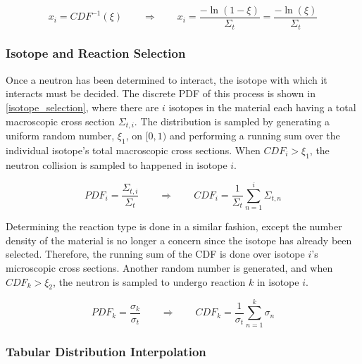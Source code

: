 \begin{equation}
\label{first_col_samp}
x_i=CDF^{-1}(\xi) \qquad \Rightarrow \qquad x_i=\frac{-\ln(1-\xi) }{\Sigma_t}=\frac{-\ln(\xi) }{\Sigma_t}
\end{equation}


\subsubsection{Isotope and Reaction Selection}

Once a neutron has been determined to interact, the isotope with which it interacts must be decided.  The discrete PDF of this process is shown in \eqref{isotope_selection}, where there are $i$ isotopes in the material each having a total macroscopic cross section $\Sigma_{t,i}$.  The distribution is sampled by generating a uniform random number, $\xi_1$, on $[0,1)$ and performing a running sum over the individual isotope's total macroscopic cross sections.  When $CDF_i > \xi_1$, the neutron collision is sampled to happened in isotope $i$.

\begin{equation}
\label{isotope_selection}
PDF_i = \frac{\Sigma_{t,i}}{\Sigma_t} \qquad \Rightarrow \qquad CDF_i = \frac{1}{\Sigma_t } \sum_{n=1}^i \Sigma_{t,n}
\end{equation}

Determining the reaction type is done in a similar fashion, except the number density of the material is no longer a concern since the isotope has already been selected.  Therefore, the running sum of the CDF is done over isotope $i$'s microscopic cross sections.  Another random number is generated, and when $CDF_k > \xi_2$, the neutron is sampled to undergo reaction $k$ in isotope $i$.

\begin{equation}
\label{reaction_selection}
PDF_k = \frac{\sigma_k}{\sigma_t} \qquad \Rightarrow \qquad CDF_k = \frac{1}{\sigma_{t} } \sum_{n=1}^k \sigma_{n}
\end{equation}


\subsubsection{Tabular Distribution Interpolation}


